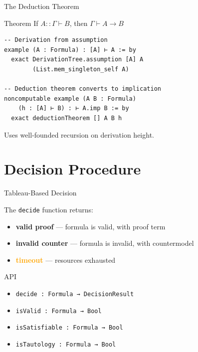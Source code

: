 \documentclass[aspectratio=169,11pt]{beamer}
\newcommand{\proves}{\vdash}
\newcommand{\imp}{\rightarrow}
\begin{document}
\begin{frame}[fragile]{The Deduction Theorem}

\begin{block}{Theorem}
If $A :: \Gamma \proves B$, then $\Gamma \proves A \imp B$
\end{block}

\begin{lstlisting}
-- Derivation from assumption
example (A : Formula) : [A] ⊢ A := by
  exact DerivationTree.assumption [A] A
        (List.mem_singleton_self A)

-- Deduction theorem converts to implication
noncomputable example (A B : Formula)
    (h : [A] ⊢ B) : ⊢ A.imp B := by
  exact deductionTheorem [] A B h
\end{lstlisting}

\vspace{0.3cm}

Uses well-founded recursion on derivation height.

\end{frame}


\section{Decision Procedure}

\begin{frame}{Tableau-Based Decision}

The \texttt{decide} function returns:

\begin{itemize}
    \item \textcolor{provengreen}{\textbf{valid proof}} --- formula is valid, with proof term
    \item \textcolor{theoremred}{\textbf{invalid counter}} --- formula is invalid, with countermodel
    \item \textcolor{orange}{\textbf{timeout}} --- resources exhausted
\end{itemize}

\vspace{0.5cm}

\begin{block}{API}
\begin{itemize}
    \item \texttt{decide : Formula → DecisionResult}
    \item \texttt{isValid : Formula → Bool}
    \item \texttt{isSatisfiable : Formula → Bool}
    \item \texttt{isTautology : Formula → Bool}
\end{itemize}
\end{block}

\end{frame}
\end{document}
